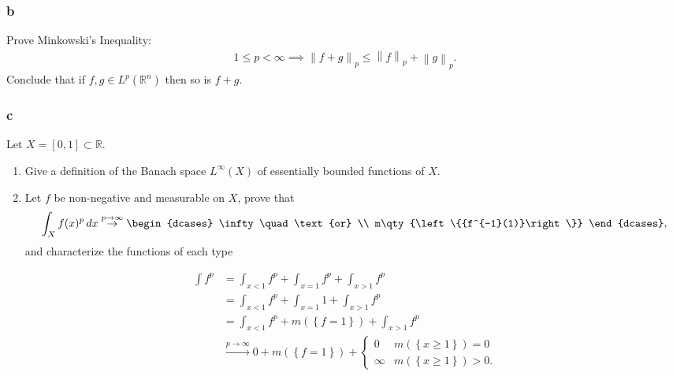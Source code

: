 \hypertarget{b-4}{%
\subsubsection{b}\label{b-4}}

Prove Minkowski's Inequality:
\begin{align*} 1\leq p < \infty \implies {\left\lVert {f+g} \right\rVert}_{p} \leq {\left\lVert {f} \right\rVert}_{p}+ {\left\lVert {g} \right\rVert}_{p} .\end{align*}
Conclude that if \(f, g\in L^p({\mathbb{R}}^n)\) then so is \(f+g\).

\hypertarget{c-2}{%
\subsubsection{c}\label{c-2}}

Let \(X = [0, 1] \subset {\mathbb{R}}\).

\begin{enumerate}
\def\labelenumi{\arabic{enumi}.}
\item
  Give a definition of the Banach space \(L^\infty(X)\) of essentially
  bounded functions of \(X\).
\item
  Let \(f\) be non-negative and measurable on \(X\), prove that
  \begin{align*}     \int_X f(x)^p \,dx \overset{p\to\infty}\to     \begin{dcases}     \infty \quad\text{or} \\     m\qty{\left\{{f^{-1}(1)}\right\}}     \end{dcases}     ,\end{align*}
  and characterize the functions of each type
\end{enumerate}

\begin{solution}

\begin{align*} \int f^p  &= \int_{x < 1} f^p + \int_{x=1}f^p + \int_{x > 1} f^p\\ &= \int_{x < 1} f^p + \int_{x=1}1 + \int_{x > 1} f^p \\ &= \int_{x < 1} f^p + m(\left\{{f = 1}\right\}) + \int_{x > 1} f^p \\ &\overset{p\to\infty}\to 0  + m(\left\{{f = 1}\right\}) +  \begin{cases}  0 & m(\left\{{x\geq 1}\right\}) = 0 \\  \infty & m(\left\{{x\geq 1}\right\}) > 0. \end{cases} \end{align*}

\end{solution}

